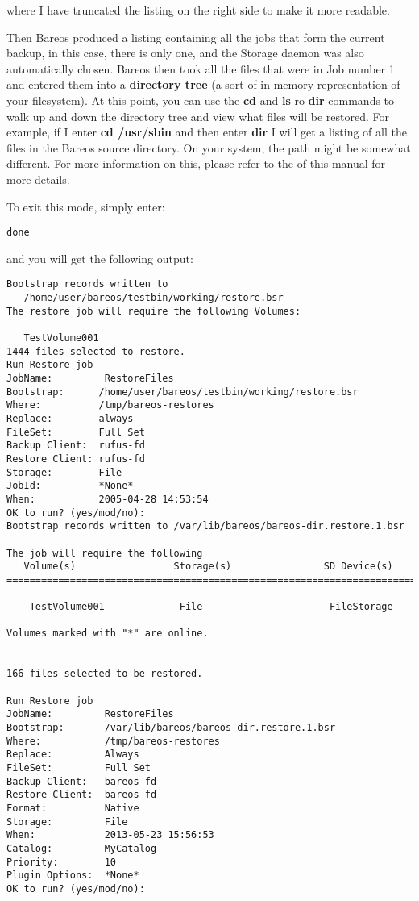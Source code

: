 where I have truncated the listing on the right side to make it more readable.

Then Bareos produced a listing containing all the jobs that
form the current backup, in this case, there is only one, and the Storage
daemon was also automatically chosen. Bareos then took all the files that were
in Job number 1 and entered them into a {\bf directory tree} (a sort of in
memory representation of your filesystem). At this point, you can use the {\bf
cd} and {\bf ls} ro {\bf dir} commands to walk up and down the directory tree
and view what files will be restored. For example, if I enter {\bf cd
/usr/sbin} and then enter {\bf dir} I will get a listing
of all the files in the Bareos source directory. On your system, the path might
be somewhat different. For more information on this, please refer to the
 of this manual for
more details.

To exit this mode, simply enter:

\footnotesize
\begin{verbatim}
done
\end{verbatim}
\normalsize

and you will get the following output:

\footnotesize
\begin{verbatim}
Bootstrap records written to
   /home/user/bareos/testbin/working/restore.bsr
The restore job will require the following Volumes:

   TestVolume001
1444 files selected to restore.
Run Restore job
JobName:         RestoreFiles
Bootstrap:      /home/user/bareos/testbin/working/restore.bsr
Where:          /tmp/bareos-restores
Replace:        always
FileSet:        Full Set
Backup Client:  rufus-fd
Restore Client: rufus-fd
Storage:        File
JobId:          *None*
When:           2005-04-28 14:53:54
OK to run? (yes/mod/no):
Bootstrap records written to /var/lib/bareos/bareos-dir.restore.1.bsr

The job will require the following
   Volume(s)                 Storage(s)                SD Device(s)
===========================================================================
   
    TestVolume001             File                      FileStorage              

Volumes marked with "*" are online.


166 files selected to be restored.

Run Restore job
JobName:         RestoreFiles
Bootstrap:       /var/lib/bareos/bareos-dir.restore.1.bsr
Where:           /tmp/bareos-restores
Replace:         Always
FileSet:         Full Set
Backup Client:   bareos-fd
Restore Client:  bareos-fd
Format:          Native
Storage:         File
When:            2013-05-23 15:56:53
Catalog:         MyCatalog
Priority:        10
Plugin Options:  *None*
OK to run? (yes/mod/no): 
\end{verbatim}
\normalsize

